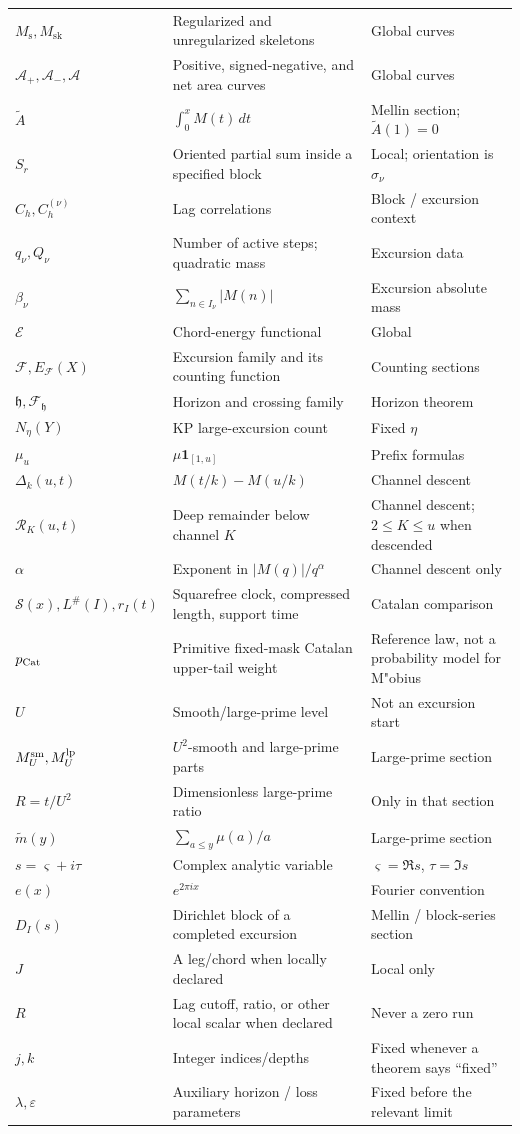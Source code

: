 \documentclass[11pt]{amsart}
\numberwithin{equation}{section}
\theoremstyle{plain}
\theoremstyle{definition}
\theoremstyle{remark}
\newcommand{\Ms}{M_{\mathrm{s}}}
\newcommand{\Msk}{M_{\mathrm{sk}}}
\newcommand{\Ap}{\mathcal{A}_{+}}
\newcommand{\Am}{\mathcal{A}_{-}}
\newcommand{\Anet}{\mathcal{A}}
\newcommand{\Sq}{\mathcal{S}}
\newcommand{\En}{\mathcal{E}}
\newcommand{\mt}{\widetilde{m}}
\newcommand{\F}{\mathcal{F}}
\begin{document}
\begin{longtable}{@{}p{}p{}p{}@{}}
$\Ms,\Msk$ & Regularized and unregularized skeletons & Global curves\\
$\Ap,\Am,\Anet$ & Positive, signed-negative, and net area curves & Global curves\\
$\widetilde A$ & $\int_0^x M(t)\,dt$ & Mellin section; $\widetilde A(1)=0$\\
$S_r$ & Oriented partial sum inside a specified block & Local; orientation is $\sigma_\nu$\\
$C_h,C_h^{(\nu)}$ & Lag correlations & Block / excursion context\\
$q_\nu,Q_\nu$ & Number of active steps; quadratic mass & Excursion data\\
$\beta_\nu$ & $\sum_{n\in I_\nu}|M(n)|$ & Excursion absolute mass\\
$\En$ & Chord-energy functional & Global\\
$\F, E_\F(X)$ & Excursion family and its counting function & Counting sections\\
$\mathfrak h,\F_{\mathfrak h}$ & Horizon and crossing family & Horizon theorem\\
$N_\eta(Y)$ & KP large-excursion count & Fixed $\eta$\\
$\mu_u$ & $\mu\mathbf1_{[1,u]}$ & Prefix formulas\\
$\Delta_k(u,t)$ & $M(t/k)-M(u/k)$ & Channel descent\\
$\mathcal R_K(u,t)$ & Deep remainder below channel $K$ & Channel descent; $2\le K\le u$ when descended\\
$\alpha$ & Exponent in $|M(q)|/q^\alpha$ & Channel descent only\\
$\Sq(x),L^\#(I),r_I(t)$ & Squarefree clock, compressed length, support time & Catalan comparison\\
$p_{\rm Cat}$ & Primitive fixed-mask Catalan upper-tail weight & Reference law, not a probability model for M"obius\\
$U$ & Smooth/large-prime level & Not an excursion start\\
$M_U^{\rm sm},M_U^{\rm lp}$ & $U^2$-smooth and large-prime parts & Large-prime section\\
$R=t/U^2$ & Dimensionless large-prime ratio & Only in that section\\
$\mt(y)$ & $\sum_{a\le y}\mu(a)/a$ & Large-prime section\\
$s=\varsigma+i\tau$ & Complex analytic variable & $\varsigma=\Re s$, $\tau=\Im s$\\
$e(x)$ & $e^{2\pi i x}$ & Fourier convention\\
$D_I(s)$ & Dirichlet block of a completed excursion & Mellin / block-series section\\
$J$ & A leg/chord when locally declared & Local only\\
$R$ & Lag cutoff, ratio, or other local scalar when declared & Never a zero run\\
$j,k$ & Integer indices/depths & Fixed whenever a theorem says ``fixed''\\
$\lambda,\varepsilon$ & Auxiliary horizon / loss parameters & Fixed before the relevant limit\\
\bottomrule
\end{longtable}
\end{document}
